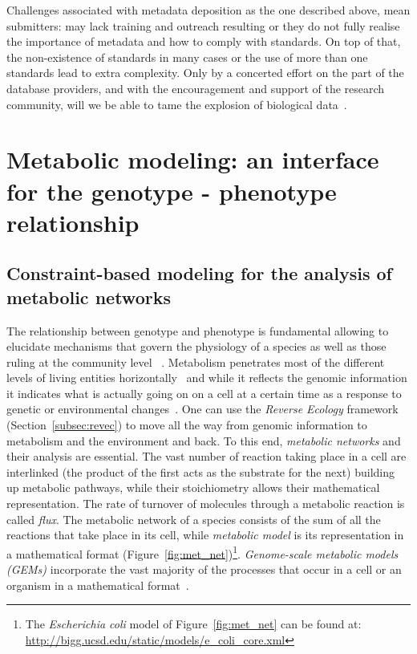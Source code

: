       Challenges associated with metadata deposition 
      as the one described above,
      mean submitters: 
      may lack training and outreach resulting 
      or they do not fully realise the importance of metadata and 
      how to comply with standards.
      On top of that, the non-existence of standards in many cases 
      or the use of more than one standards lead to extra complexity.
      Only by a concerted effort on the part of the database providers, and with the encouragement and support of the research community, will we be able to tame the explosion of biological data~\citep{stein2003integrating}.
\section{Metabolic modeling: an interface for the genotype - phenotype relationship}


   \subsection{Constraint-based modeling for the analysis of metabolic networks}
   \label{subesec:modling}

      The relationship between genotype and phenotype is fundamental allowing to elucidate 
      mechanisms that govern the physiology of a species as well as those 
      ruling at the community level
      ~\citep{morris2020linking}.
      Metabolism penetrates most of the different levels of living entities horizontally~\citep{schramski2015metabolic} and 
      while it reflects the genomic information it indicates 
      what is actually going on on a cell at a certain time
      as a response to genetic or environmental changes~\citep{lima2021role}.
      One can use the \textit{Reverse Ecology} framework (Section~\ref{subsec:revec})
      to move all the way from genomic information to metabolism and the environment and back.
      To this end, \textit{metabolic networks} and their analysis are essential. 
      The vast number of reaction taking place in a cell are interlinked 
      (the product of the first acts as the substrate for the next) 
      building up metabolic pathways,
      while their stoichiometry allows their mathematical representation. 
      The rate of turnover of molecules through a metabolic reaction is called \textit{flux}.
      The metabolic network of a species consists of the sum of all the reactions that 
      take place in its cell,
      while \textit{metabolic model} is its representation in a mathematical format (Figure~\ref{fig:met_net})\footnote{               
         The \textit{Escherichia coli} model of Figure~\ref{fig:met_net} can be found at:\\
            \href{http://bigg.ucsd.edu/static/models/e_coli_core.xml}{http://bigg.ucsd.edu/static/models/e\_coli\_core.xml}
      }. 
      \textit{Genome-scale metabolic models (GEMs)} incorporate the vast majority of the 
      processes that occur in a cell or an organism in a mathematical format~\citep{feist2009reconstruction}.



